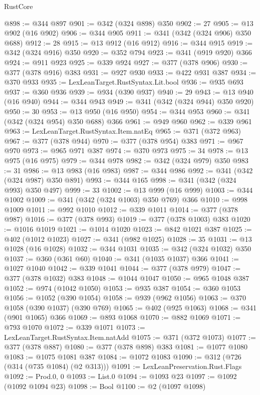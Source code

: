 \begin{lexlean}{RustCore}
\begin{coremodule}
@898 := @344 @897
@901 := @342 (@324 @898) @350
@902 := 27
@905 := @13 @902 (@16 @902)
@906 := @344 @905
@911 := @341 (@342 (@324 @906) @350 @688)
@912 := 28
@915 := @13 @912 (@16 @912)
@916 := @344 @915
@919 := @342 (@324 @916) @350
@920 := @352 @794
@923 := @341 (@919 @920) @366
@924 := @911 @923
@925 := @339 @924
@927 := @377 (@378 @906)
@930 := @377 (@378 @916) @383
@931 := @927 @930
@933 := @422 @931 @387
@934 := @370 @933
@935 := LexLeanTarget.RustSyntax.Lit.bool
@936 := @935 @693
@937 := @360 @936
@939 := @934 (@390 @937)
@940 := 29
@943 := @13 @940 (@16 @940)
@944 := @344 @943
@949 := @341 (@342 (@324 @944) @350 @920)
@950 := 30
@953 := @13 @950 (@16 @950)
@954 := @344 @953
@960 := @341 (@342 (@324 @954) @350 @688) @366
@961 := @949 @960
@962 := @339 @961
@963 := LexLeanTarget.RustSyntax.Item.natEq
@965 := @371 (@372 @963)
@967 := @377 (@378 @944)
@970 := @377 (@378 @954) @383
@971 := @967 @970
@973 := @965 @971 @387
@974 := @370 @973
@975 := 34
@978 := @13 @975 (@16 @975)
@979 := @344 @978
@982 := @342 (@324 @979) @350
@983 := 31
@986 := @13 @983 (@16 @983)
@987 := @344 @986
@992 := @341 (@342 (@324 @987) @350 @891)
@993 := @344 @165
@998 := @341 (@342 (@324 @993) @350 @497)
@999 := 33
@1002 := @13 @999 (@16 @999)
@1003 := @344 @1002
@1009 := @341 (@342 (@324 @1003) @350 @769) @366
@1010 := @998 @1009
@1011 := @992 @1010
@1012 := @339 @1011
@1014 := @377 (@378 @987)
@1016 := @377 (@378 @993)
@1019 := @377 (@378 @1003) @383
@1020 := @1016 @1019
@1021 := @1014 @1020
@1023 := @842 @1021 @387
@1025 := @402 (@1012 @1023)
@1027 := @341 (@982 @1025)
@1028 := 35
@1031 := @13 @1028 (@16 @1028)
@1032 := @344 @1031
@1035 := @342 (@324 @1032) @350
@1037 := @360 (@361 @60)
@1040 := @341 (@1035 @1037) @366
@1041 := @1027 @1040
@1042 := @339 @1041
@1044 := @377 (@378 @979)
@1047 := @377 (@378 @1032) @383
@1048 := @1044 @1047
@1050 := @965 @1048 @387
@1052 := @974 (@1042 @1050)
@1053 := @935 @387
@1054 := @360 @1053
@1056 := @1052 (@390 @1054)
@1058 := @939 (@962 @1056)
@1063 := @370 @1058 (@390 @1037) (@390 @769)
@1065 := @402 (@925 @1063)
@1068 := @341 (@901 @1065) @366
@1069 := @893 @1068
@1070 := @882 @1069
@1071 := @793 @1070
@1072 := @339 @1071
@1073 := LexLeanTarget.RustSyntax.Item.natAdd
@1075 := @371 (@372 @1073)
@1077 := @377 (@378 @887)
@1080 := @377 (@378 @898) @383
@1081 := @1077 @1080
@1083 := @1075 @1081 @387
@1084 := @1072 @1083
@1090 := @312 (@726 (@314 (@735 @1084) (@2 @313)))
@1091 := LexLeanPreservation.Rust.Flags
@1092 := Prod.{0, 0}
@1093 := List.{0}
@1094 := @1093 @23
@1097 := @1092 (@1092 @1094 @23)
@1098 := Bool
@1100 := @2 (@1097 @1098)

\end{coremodule}
\end{lexlean}

